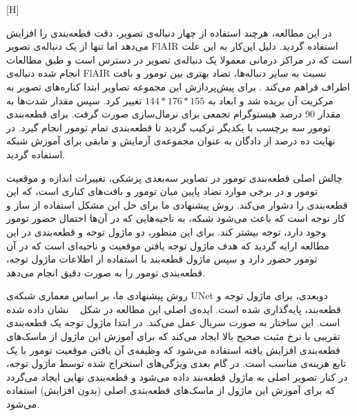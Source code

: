 [H]

در این مطالعه، هرچند استفاده از چهار دنباله‌ی تصویر، دقت قطعه‌بندی را افزایش می‌دهد اما تنها از یک دنباله‌ی تصویر FlAIR استفاده گردید. دلیل این‌کار به این علت است که در مراکز درمانی معمولا یک دنباله‌ی تصویر در دسترس است و طبق مطالعات انجام شده دنباله‌ی FlAIR نسبت به سایر دنباله‌ها، تضاد بهتری بین تومور و بافت اطراف فراهم می‌کند . برای پیش‌پردازش این مجموعه تصاویر ابتدا کناره‌های تصویر به مرکزیت آن بریده شد و ابعاد به $144*176*155$ تغییر کرد. سپس مقدار شدت‌ها به مقدار 90 درصد هیستوگرام تجمعی برای نرمال‌سازی صورت گرفت. برای قطعه‌بندی تومور سه برچسب با یکدیگر ترکیب گردید تا قطعه‌بندی تمام تومور انجام گیرد. در نهایت ده درصد از دادگان به عنوان مجموعه‌ی آزمایش و مابقی برای آموزش شبکه‌ استفاده گردید.


چالش اصلی قطعه‌بندی تومور در تصاویر سه‌بعدی پزشکی، تغییرات اندازه و موقعیت تومور و در برخی موارد تضاد پایین میان تومور و بافت‌های کناری است، که این قطعه‌بندی را دشوار می‌کند. روش پیشنهادی ما برای حل این مشکل استفاده از ساز و کار توجه است که باعث می‌شود شبکه، به ناحیه‌هایی که در آن‌ها احتمال حضور تومور وجود دارد، توجه بیشتر کند. برای این منظور، دو ماژول توجه و قطعه‌بندی در این مطالعه‌ ارایه گردید که هدف ماژول توجه یافتن موقعیت و ناحیه‌ای است که در آن تومور حضور دارد و سپس ماژول قطعه‌بند با استفاده از اطلاعات ماژول توجه، قطعه‌بندی تومور را به صورت دقیق انجام می‌دهد. 

روش پیشنهادی ما، بر اساس معماری شبکه‌ی UNet دوبعدی، برای ماژول توجه و قطعه‌بند، پایه‌گذاری شده است. ایده‌ی اصلی این مطالعه در شکل ~ نشان داده شده است. این ساختار به صورت سریال عمل می‌کند. در ابتدا ماژول توجه یک قطعه‌بندی تقریبی با نرخ مثبت صحیح بالا ایجاد می‌کند که برای آموزش این ماژول از ماسک‌های قطعه‌بندی افزایش  یافته استفاده می‌شود که وظیفه‌ی آن یافتن موقعیت تومور با یک تابع هزینه‌ی مناسب است. در گام بعدی ویژگی‌های استخراج شده توسط ماژول توجه، در کنار تصویر اصلی به ماژول قطعه‌بند داده می‌شود و قطعه‌بندی نهایی ایجاد می‌گردد که برای آموزش این ماژول از ماسک‌های قطعه‌بندی اصلی (بدون افزایش) استفاده می‌شود.

